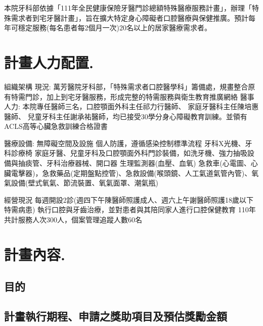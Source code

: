 
本院牙科部依據「111年全民健康保險牙醫門診總額特殊醫療服務計畫」，辦理「特殊需求者到宅牙醫計畫」，旨在擴大特定身心障礙者口腔醫療與保健推廣。預計每年可穩定服務(每名患者每2個月一次)20名以上的居家醫療需求者。

\section*{計畫人力配置.}
\begin{outline}

\1 組織架構
\2 現況: 萬芳醫院牙科部，「特殊需求者口腔醫學科」籌備處，規畫整合原有特需門診，加上到宅牙醫服務，形成完整的特需服務與衛生教育推廣網絡
\2 醫事人力: %
本院專任醫師三名，口腔顎面外科主任祁力行醫師、
家庭牙醫科主任陳培惠醫師、
兒童牙科主任謝承祐醫師，均已接受30學分身心障礙教育訓練。並領有ACLS高等心臟急救訓練合格證書

\1 醫療設備: 
\2 無障礙空間及設施
\2 個人防護，遵循感染控制標準流程
\2 牙科X光機、牙科診療椅
\2 家庭牙醫、兒童牙科及口腔顎面外科門診裝備，如洗牙機、強力抽吸設備與抽痰管、牙科治療器械、開口器
\2 生理監測器(血壓、血氧)
\2 急救車(心電圖、心臟電擊器)，急救藥品(定期盤點控管)、急救設備(喉頭鏡、人工氣道氣管內管)、氧氣設備(壁式氧氣、節流裝置、氧氣面罩、潮氣瓶)

\1 經營現況
\2 每週開設2診(週四下午陳醫師照護成人、週六上午謝醫師照護18歲以下特需病患)
\2 執行口腔與牙齒治療，並對患者與其陪同家人進行口腔保健教育
\2 110年共計服務人次300人，個案管理追蹤人數60名
\end{outline}


\section*{計畫內容.}

\subsection{目的}

\subsection{計畫執行期程、申請之獎助項目及預估獎勵金額}

